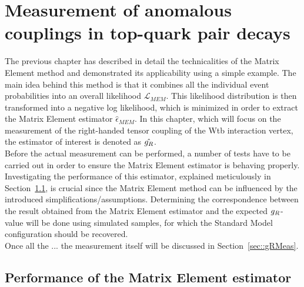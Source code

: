 \chapter{Measurement of anomalous couplings in top-quark pair decays} \label{ch::Analysis}

The previous chapter has described in detail the technicalities of the Matrix Element method and demonstrated its applicability using a simple example.
The main idea behind this method is that it combines all the individual event probabilities into an overall likelihood $\mathcal{L}_{MEM}$.
This likelihood distribution is then transformed into a negative log likelihood, which is minimized in order to extract the Matrix Element estimator $\hat{\epsilon}_{MEM}$.
In this chapter, which will focus on the measurement of the right-handed tensor coupling of the Wtb interaction vertex, the estimator of interest is denoted as $\hat{g_{R}}$.
\\

Before the actual measurement can be performed, a number of tests have to be carried out in order to ensure the Matrix Element estimator is behaving properly.
Investigating the performance of this estimator, explained meticulously in Section~\ref{sec::EstimatorProp}, is crucial since the Matrix Element method can be influenced by the introduced simplifications/assumptions.
Determining the correspondence between the result obtained from the Matrix Element estimator and the expected $g_{R}$-value will be done using simulated samples, for which the Standard Model configuration should be recovered.
%
%
\\
Once all the ... the measurement itself will be discussed in Section~\ref{sec::gRMeas}.

\section{Performance of the Matrix Element estimator} \label{sec::EstimatorProp} %

